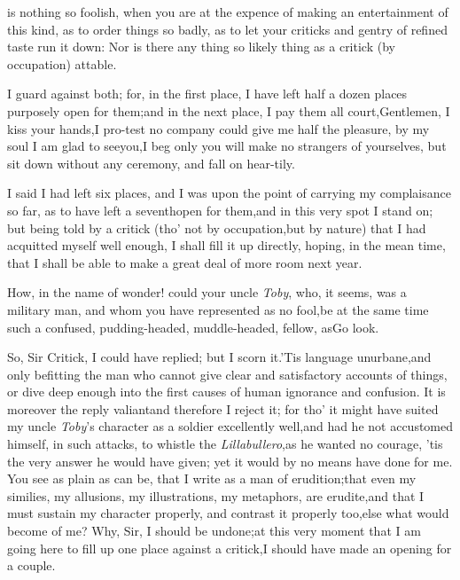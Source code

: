 \documentclass{article}
\begin{document}
 is nothing so foolish, when you
are at the expence of making an entertainment of this kind, as to
order things so badly, as to let your criticks and gentry of
refined taste run it down: Nor is there any thing so likely
thing as a critick (by occupation) at\break table.

\tsh I guard against both; for, in the first place, I have left
half a dozen places purposely open for them;\tsk and in the next
place, I pay them all court,\tsk\break Gentlemen, I kiss your
hands,\tsh I pro-\break test no company could give me half the pleasure,\tsk
by my soul I am glad to see\break you,\tsh I beg only you will make no
strangers of yourselves, but sit down without any ceremony, and
fall on hear-\break tily.\\\newpage

I said I had left six places, and I was upon the point of
carrying my complaisance so far, as to have left a seventh\break open for
them,\tsk and in this very spot I stand on; but being told by a
critick (tho’ not by occupation,\tsk but by nature) that I
had acquitted myself well enough, I shall fill it up directly,
hoping, in the mean time, that I shall be able to make a great deal
of more room next year.

\tsh How, in the name of wonder! could your
uncle \textit{Toby}, who, it seems, was a military man, and whom you
have represented as no fool,\tsk be at the same time such a
confused, pudding-headed, muddle-headed, fellow, as\tsk Go
look.

So, Sir Critick, I could have replied; but I scorn it.\tsh ’Tis
language un\-urbane,\tsk and only befitting the man
who cannot give clear and satisfactory accounts of things,
or dive deep enough into the first causes of human ignorance
and confusion. It is moreover the reply valiant\tsk and
therefore I reject it;\break
for tho’ it might have suited my
uncle \textit{Toby}’s character as a soldier excellently
well,\tsk and had he not accustomed him\-self, in such
attacks, to whistle the \textit{Lilla\-bullero},\tsk as he
wanted no courage, ’tis the very answer he would have
given;\break
yet it would by no means have done for me. You see as plain
as can be, that I write as a man of erudition;\tsk that even
my similies, my allusions, my illustrations, my metaphors,
are erudite,\tsk and that I must sustain my character
properly, and contrast it properly too,\tsk else what would
become of me?  Why, Sir, I should be undone;\tsk at this
very moment that I am going here to fill up one
place against a critick,\tsk I should have made an opening
for a couple.
\end{document}
